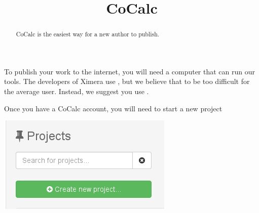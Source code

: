 \documentclass{ximera}
\title{CoCalc}
\begin{document}
\begin{abstract}
CoCalc is the easiest way for a new author to publish.
\end{abstract}
\maketitle


To publish your work to the internet, you will need a computer that
can run our tools. The developers of Ximera use , but we believe that to be too difficult for the average user. Instead, we suggest you use .

Once you have a CoCalc account, you will need to start a new project

\begin{image}
  \includegraphics{createNewProject.png}
\end{image}
\end{document}
